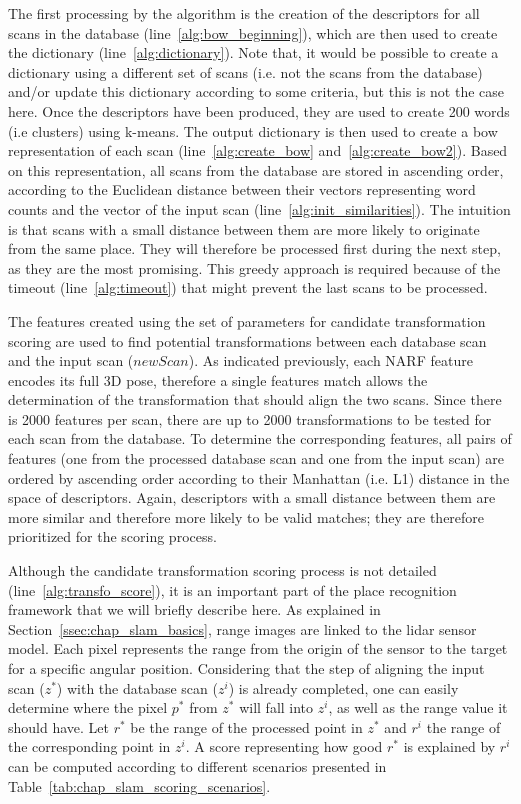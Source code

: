 The first processing by the algorithm is the creation of the descriptors for all scans in the database (line~\ref{alg:bow_beginning}), which are then used to create the dictionary (line~\ref{alg:dictionary}). Note that, it would be possible to create a dictionary using a different set of scans (i.e. not the scans from the database) and/or update this dictionary according to some criteria, but this is not the case here. Once the descriptors have been produced, they are used to create 200 words (i.e clusters) using k-means. The output dictionary is then used to create a \gls*{bow} representation of each scan (line~\ref{alg:create_bow} and~\ref{alg:create_bow2}). Based on this representation, all scans from the database are stored in ascending order, according to the Euclidean distance between their vectors representing word counts and the vector of the input scan (line~\ref{alg:init_similarities}). The intuition is that scans with a small distance between them are more likely to originate from the same place. They will therefore be processed first during the next step, as they are the most promising. This greedy approach is required because of the timeout (line~\ref{alg:timeout}) that might prevent the last scans to be processed.

The features created using the set of parameters for candidate transformation scoring are used to find potential transformations between each database scan and the input scan ($newScan$). As indicated previously, each NARF feature encodes its full 3D pose, therefore a single features match allows the determination of the transformation that should align the two scans. Since there is 2000 features per scan, there are up to 2000 transformations to be tested for each scan from the database. To determine the corresponding features, all pairs of features (one from the processed database scan and one from the input scan) are ordered by ascending order according to their Manhattan (i.e. L1) distance in the space of descriptors. Again, descriptors with a small distance between them are more similar and therefore more likely to be valid matches; they are therefore prioritized for the scoring process.

Although the candidate transformation scoring process is not detailed (line~\ref{alg:transfo_score}), it is an important part of the place recognition framework that we will briefly describe here. As explained in Section~\ref{ssec:chap_slam_basics}, range images are linked to the \gls*{lidar} sensor model. Each pixel represents the range from the origin of the sensor to the target for a specific angular position. Considering that the step of aligning the input scan ($z^*$) with the database scan ($z^i$) is already completed, one can easily determine where the pixel $p^*$ from $z^*$ will fall into $z^i$, as well as the range value it should have. Let $r^*$ be the range of the processed point in $z^*$ and $r^i$ the range of the corresponding point in $z^i$. A score representing how good $r^*$ is explained by $r^i$ can be computed according to different scenarios presented in Table~\ref{tab:chap_slam_scoring_scenarios}.

